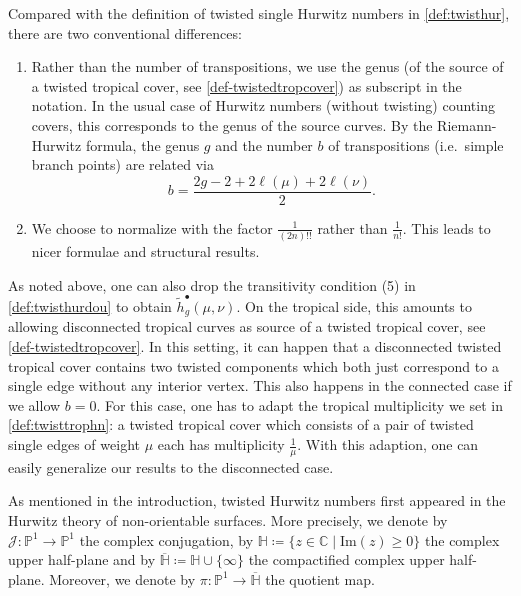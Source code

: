 \documentclass[ALCO,published]{cedram}
\begin{document}
\begin{rema}
Compared with the definition of twisted single Hurwitz numbers in \cref{def:twisthur}, there are two conventional differences:
\begin{enumerate}
    \item Rather than the number of transpositions, we use the genus (of the source of a twisted tropical cover, see \cref{def-twistedtropcover}) as subscript in the notation. In the usual case of Hurwitz numbers (without twisting) counting covers, this corresponds to the genus of the source curves. By the Riemann-Hurwitz formula, the genus $g$ and the number $b$ of transpositions (i.e.\ simple branch points) are related via
    $$b=\frac{2g-2+2\ell(\mu)+2\ell(\nu)}{2}.$$

    \item We choose to normalize with the factor $\frac{1}{(2n)!!}$ rather than $\frac{1}{n!}$. This leads to nicer formulae and structural results.
\end{enumerate}

\end{rema}
\begin{rema}
    As noted above, one can also drop the transitivity condition (5) in \cref{def:twisthurdou} to obtain $\tilde{h}_g^\bullet(\mu,\nu)$. On the tropical side, this amounts to allowing disconnected tropical curves as source of a twisted tropical cover, see \cref{def-twistedtropcover}. In this setting, it can happen that a disconnected twisted tropical cover contains two twisted components which both just correspond to a single edge without any interior vertex. This also happens in the connected case if we allow $b=0$. For this case, one has to adapt the tropical multiplicity we set in \cref{def:twisttrophn}: a twisted tropical cover which consists of a pair of twisted single edges of weight $\mu$ each has multiplicity $\frac{1}{\mu}$. With this adaption, one can easily generalize our results to the disconnected case.
\end{rema}

As mentioned in the introduction, twisted Hurwitz numbers first appeared in the Hurwitz theory of non-orientable surfaces. More precisely, we denote by $\mathcal{J}\colon\mathbb{P}^1\to\mathbb{P}^1$ the complex conjugation, by $\mathbb{H}\coloneqq\{z\in\mathbb{C}\mid\mathrm{Im}(z)\ge0\}$ the complex upper half-plane and by $\overline{\mathbb{H}}\coloneqq\mathbb{H}\cup\{\infty\}$ the compactified complex upper half-plane. Moreover, we denote by $\pi\colon\mathbb{P}^1\to\overline{\mathbb{H}}$ the quotient map.
\end{document}
